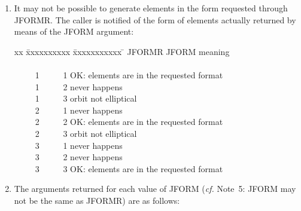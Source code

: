 \documentclass[11pt,twoside]{article}
\begin{document}
{\begin{enumerate}
        JFORM=3, suitable for comets:

        \begin{tabbing}
        xxx \= xxxxxxxx \= xx \= \kill
        \> EPOCH  \> = \> epoch of perihelion $T$ (TT MJD) \\
        \> ORBINC \> = \> inclination $i$ (radians) \\
        \> ANODE  \> = \> longitude of the ascending node $\Omega$ (radians) \\
        \> PERIH  \> = \> argument of perihelion $\omega$ (radians) \\
        \> AORQ   \> = \> perihelion distance $q$ (AU) \\
        \> E      \> = \> eccentricity $e$ $( 0 \leq e \leq 10 )$
        \end{tabbing}
  \item It may not be possible to generate elements in the form
        requested through JFORMR.  The caller is notified of the form
        of elements actually returned by means of the JFORM argument:

        \begin{tabbing}
        xx \= xxxxxxxxxx \= xxxxxxxxxxx \= \kill
        \> JFORMR   \> JFORM   \> meaning \\ \\
        \> ~~~~~1   \> ~~~~~1  \> OK: elements are in the requested format \\
        \> ~~~~~1   \> ~~~~~2  \> never happens \\
        \> ~~~~~1   \> ~~~~~3  \> orbit not elliptical \\
        \> ~~~~~2   \> ~~~~~1  \> never happens \\
        \> ~~~~~2   \> ~~~~~2  \> OK: elements are in the requested format \\
        \> ~~~~~2   \> ~~~~~3  \> orbit not elliptical \\
        \> ~~~~~3   \> ~~~~~1  \> never happens \\
        \> ~~~~~3   \> ~~~~~2  \> never happens \\
        \> ~~~~~3   \> ~~~~~3  \> OK: elements are in the requested format
        \end{tabbing}
  \item The arguments returned for each value of JFORM ({\it cf.}\/ Note~5:
        JFORM may not be the same as JFORMR) are as follows:


\end{enumerate}}
\end{document}
